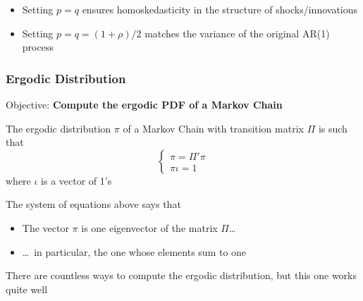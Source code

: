 \documentclass[10pt, aspectratio=1610, handout]{beamer}
\begin{document}
\begin{frame}
    \vfill\pause

    \begin{itemize}
      \item Setting $p = q$ ensures homoskedasticity in the structure of shocks/innovations
      \item Setting $p = q = (1 + \rho) / 2$ matches the variance of the original AR(1) process
    \end{itemize}

  \end{frame}

  \begin{frame}
    \frametitle{Ergodic Distribution}

    Objective: \textbf{Compute the ergodic PDF of a Markov Chain}

    \vfill

    The ergodic distribution $\pi$ of a Markov Chain with transition matrix $\Pi$ is such that
    \begin{equation*}
      \begin{cases}
        \pi = \Pi' \pi \\
        \pi \iota = 1
      \end{cases}
    \end{equation*}
    where $\iota$ is a vector of 1's

    \vfill

    The system of equations above says that
    \begin{itemize}
      \item The vector $\pi$ is one eigenvector of the matrix $\Pi$\dots
      \item \dots\ in particular, the one whose elements sum to one
    \end{itemize}
    There are countless ways to compute the ergodic distribution, but this one works quite well

  \end{frame}
\end{document}
